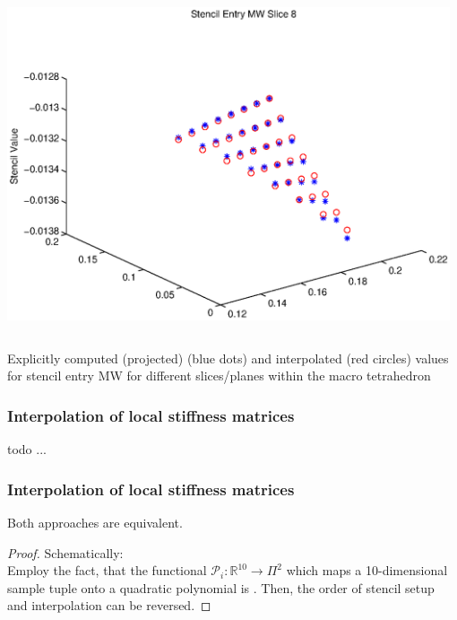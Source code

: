 \documentclass[t,compress=false,usepdftitle=false]{beamer}
\def\RR{\mathbb{R}}
\def\P{\mathcal{P}}
\begin{document}
\begin{frame}
\begin{columns}[T]
\begin{column}[T]{4.1cm}
  \includegraphics[width=0.98\textwidth]{stencilMW_slice8}\\
\end{column}
\end{columns}
\vspace{0.5cm}
\centering
Explicitly computed (projected) (blue dots) and interpolated 
(red circles) values for stencil entry
MW for different slices/planes within the macro tetrahedron
\end{frame}

%
%
\begin{frame}\frametitle{Interpolation of local stiffness matrices}


todo ...

\end{frame}

%
%
\begin{frame}\frametitle{Interpolation of local stiffness matrices}


\begin{theorem}
Both approaches are equivalent.
\end{theorem}

\begin{proof}
Schematically:\\
Employ the fact, that the functional
$\P_i : \RR^{10} \rightarrow \Pi^2$ which maps a
10-dimensional sample tuple 
onto a quadratic polynomial is .
Then, the order of stencil setup and interpolation 
can be reversed.
\end{proof}


\end{frame}
\end{document}
